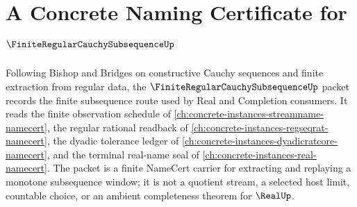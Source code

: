 \chapter{A Concrete Naming Certificate for $\FiniteRegularCauchySubsequenceUp$}
\label{ch:concrete-instances-finite-regular-cauchy-subsequence-namecert}

Following Bishop and Bridges on constructive Cauchy sequences and finite extraction from regular data, the $\FiniteRegularCauchySubsequenceUp$ packet records the finite subsequence route used by Real and Completion consumers. It reads the finite observation schedule of \autoref{ch:concrete-instances-streamname-namecert}, the regular rational readback of \autoref{ch:concrete-instances-regseqrat-namecert}, the dyadic tolerance ledger of \autoref{ch:concrete-instances-dyadicratcore-namecert}, and the terminal real-name seal of \autoref{ch:concrete-instances-real-namecert}. The packet is a finite NameCert carrier for extracting and replaying a monotone subsequence window; it is not a quotient stream, a selected host limit, countable choice, or an ambient completeness theorem for $\RealUp$.


